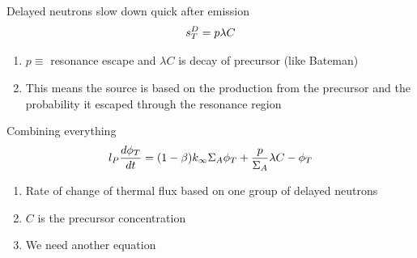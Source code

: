 \documentclass[aspectratio=1610,pdftex,dvipsnames,compress,xcolor={dvipsnames}]{beamer}
\begin{document}
\begin{frame}{Delayed neutrons slow down quick after emission}
    \begin{equation}
        \LARGE
        s_T^D=p\lambda C
    \end{equation}

    \vspace*{\fill}

    \begin{enumerate}[series=outerlist,topsep=0pt,itemsep=21pt,leftmargin=*,label=(\arabic*)]
        \item[]$p \equiv$ resonance escape and $\lambda C$ is decay of precursor (like Bateman)
        \item[]This means the source is based on the production from the precursor and the probability it escaped through the resonance region
    \end{enumerate}
\end{frame}


\begin{frame}{Combining everything}
    \begin{equation}
        \LARGE
        l_P \frac{d\phi_T}{dt} = (1-\beta) k_\infty \Sigma_A \phi_T + \frac{p}{\Sigma_A} \lambda C - \phi_T
    \end{equation}

    \vspace*{\fill}

    \begin{enumerate}[series=outerlist,topsep=0pt,itemsep=21pt,leftmargin=*,label=(\arabic*)]
        \item[]Rate of change of thermal flux based on one group of delayed neutrons
        \item[]$C$ is the precursor concentration
        \item[]We need another equation
    \end{enumerate}
\end{frame}
\end{document}
